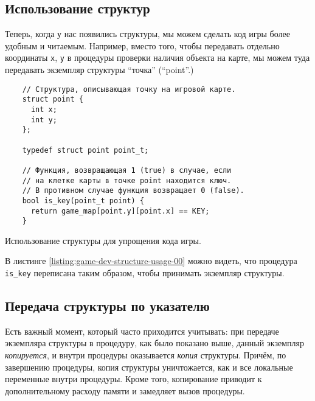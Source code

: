 \documentclass[../sparc.tex]{subfiles}
\begin{document}
\subsection{Использование структур}

Теперь, когда у нас появились структуры, мы можем сделать код игры более удобным
и читаемым. Например, вместо того, чтобы передавать отдельно координаты
\texttt{x}, \texttt{y} в процедуры проверки наличия объекта на
карте, мы можем туда передавать экземпляр структуры ``точка'' (``point''.)

\begin{listing}[H]
  \begin{verbatim}
    // Структура, описывающая точку на игровой карте.
    struct point {
      int x;
      int y;
    };

    typedef struct point point_t;

    // Функция, возвращающая 1 (true) в случае, если
    // на клетке карты в точке point находится ключ.
    // В противном случае функция возвращает 0 (false).
    bool is_key(point_t point) {
      return game_map[point.y][point.x] == KEY;
    }
  \end{verbatim}
  \caption{Использование структуры для упрощения кода игры.}
  \label{listing:game-dev-structure-usage-00}
\end{listing}

В листинге \ref{listing:game-dev-structure-usage-00} можно видеть, что процедура
\texttt{is_key} переписана таким образом, чтобы принимать экземпляр
структуры.

\subsection{Передача структуры по указателю}

Есть важный момент, который часто приходится учитывать: при передаче экземпляра
структуры в процедуру, как было показано выше, данный экземпляр
\emph{копируется}, и внутри процедуры оказывается \emph{копия} структуры.
Причём, по завершению процедуры, копия структуры уничтожается, как и все
локальные переменные внутри процедуры.  Кроме того, копирование приводит к
дополнительному расходу памяти и замедляет вызов процедуры.
\end{document}
